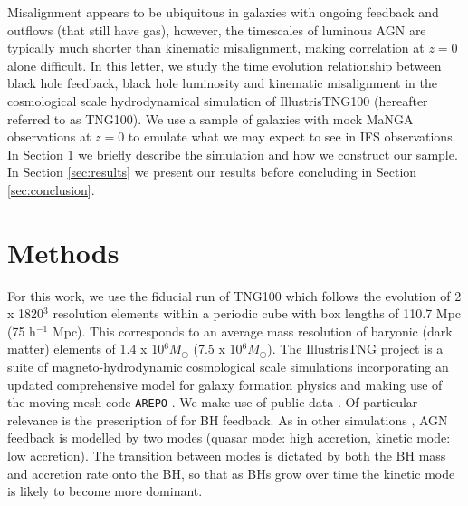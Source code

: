 \documentclass[fleqn,usenatbib]{mnras}
\newcommand{\red}[1]{{\textcolor{red}{#1}}}
\begin{document}

Misalignment appears to be ubiquitous in galaxies with ongoing feedback and outflows (that still have gas), however, the timescales of luminous AGN are typically much shorter than kinematic misalignment, making correlation at $z=0$ alone difficult. In this letter, we study the time evolution relationship between black hole feedback, black hole luminosity and kinematic misalignment in the cosmological scale hydrodynamical simulation of IllustrisTNG100 (hereafter referred to as TNG100). We use a sample of galaxies with mock MaNGA \citep[Mapping Galaxies at Apache Point;][]{bundy2015, blanton2017} observations at $z=0$ to emulate what we may expect to see in IFS observations. In Section \ref{sec:methods} we briefly describe the simulation and how we construct our sample. In Section \ref{sec:results} we present our results before concluding in Section \ref{sec:conclusion}.

\section{Methods} \label{sec:methods}
For this work, we use the fiducial run of TNG100 which follows the evolution of 2 x 1820$^3$ resolution elements within a periodic cube with box lengths of 110.7 Mpc (75 h$^{-1}$ Mpc). This corresponds to an average mass resolution of baryonic (dark matter) elements of 1.4 x 10$^6 M_{\odot}$ (7.5 x 10$^6 M_{\odot}$). The IllustrisTNG project \citep{marinacci18,naiman18,nelson18,pillepich18b,springel18} is a suite of magneto-hydrodynamic cosmological scale simulations incorporating an updated comprehensive model for galaxy formation physics \citep[][]{weinberger17,pillepich18a} and making use of the moving-mesh code \texttt{AREPO} \citep{springel10,pakmor11,pakmor13}. We make use of public data \citep[as described in][]{nelson2019}. Of particular relevance is the prescription of \citet{weinberger17} for BH feedback. As in other simulations \citep[e.g.][]{dubois2016}, AGN feedback is modelled by two modes (quasar mode: high accretion, kinetic mode: low accretion). The transition between modes is dictated by both the BH mass and accretion rate onto the BH, so that as BHs grow over time the kinetic mode is likely to become more dominant. 
\end{document}
